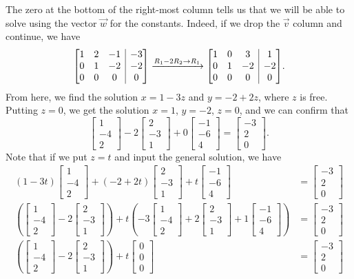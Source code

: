 \documentclass[12pt]{article}
\makeatletter
\newenvironment{amatrix}[1]{%
  \left[\begin{array}{@{}*{#1}{c}|c@{}}
}{%
  \end{array}\right]
}
\newcommand{\bbm}{\begin{bmatrix}}
\newcommand{\ebm}{\end{bmatrix}}
\newcommand{\bam}{\begin{amatrix}}
\newcommand{\eam}{\end{amatrix}}
\makeatother
\begin{document}
\begin{enumerate}
The zero at the bottom of the right-most column tells us that we will be able to solve using the vector $\vec{w}$ for the constants. Indeed, if we drop the $\vec{v}$ column and continue, we have
\[
\bam{3}1&2&-1&-3\\
0&1&-2&-2\\
0&0&0&0\eam \xrightarrow{R_1-2R_2\to R_1} \bam{3}1&0&3&1\\0&1&-2&-2\\0&0&0&0\eam.
\]
From here, we find the solution $x=1-3z$ and $y=-2+2z$, where $z$ is free. Putting $z=0$, we get the solution $x=1$, $y=-2$, $z=0$, and we can confirm that
\[\bbm 1\\-4\\2\ebm-2 \bbm 2\\-3\\1\ebm+0 \bbm -1\\-6\\4\ebm=\bbm -3\\2\\0\ebm.
\]
Note that if we put $z=t$ and input the general solution, we have
\begin{align*}
(1-3t)\bbm 1\\-4\\2\ebm+(-2+2t)\bbm 2\\-3\\1\ebm + t\bbm -1\\-6\\4\ebm & =  \bbm -3\\2\\0\ebm\\
\left(\bbm 1\\-4\\2\ebm-2 \bbm 2\\-3\\1\ebm\right)+t\left(-3\bbm 1\\-4\\2\ebm+2\bbm 2\\-3\\1\ebm + 1\bbm -1\\-6\\4\ebm\right) & = \bbm -3\\2\\0\ebm\\
\left(\bbm 1\\-4\\2\ebm-2 \bbm 2\\-3\\1\ebm\right)+t\bbm 0\\0\\0\ebm &= \bbm -3\\2\\0\ebm

\end{align*}
\end{enumerate}
\end{document}
